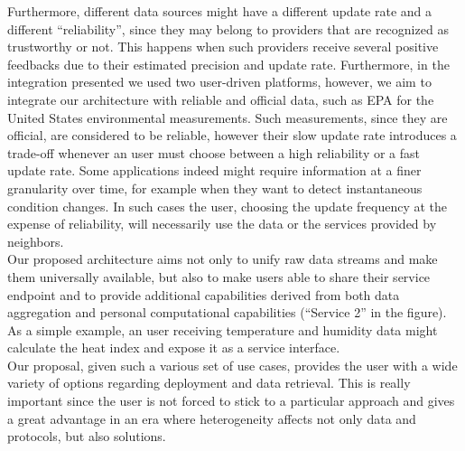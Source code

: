 Furthermore, different data sources might have a different update rate and a different ``reliability'', since they may belong to providers that are recognized as trustworthy or not.
This happens when such providers receive several positive feedbacks due to their estimated precision and update rate.
Furthermore, in the integration presented we used two user-driven platforms, however, we aim to integrate our architecture with reliable and official data, such as EPA for the United States environmental measurements.
Such measurements, since they are official, are considered to be reliable, however their slow update rate introduces a trade-off whenever an user must choose between a high reliability or a fast update rate.
Some applications indeed might require information at a finer granularity over time, for example when they want to detect instantaneous condition changes.
In such cases the user, choosing the update frequency at the expense of reliability, will necessarily use the data or the services provided by neighbors.
\\

Our proposed architecture aims not only to unify raw data streams and make them universally available, but also to make users able to share their service endpoint and to provide additional capabilities derived from both data aggregation and personal computational capabilities (``Service 2'' in the figure).
As a simple example, an user receiving temperature and humidity data might calculate the heat index and expose it as a service interface.
\\

Our proposal, given such a various set of use cases, provides the user with a wide variety of options regarding deployment and data retrieval.
This is really important since the user is not forced to stick to a particular approach and gives a great advantage in an era where heterogeneity affects not only data and protocols, but also solutions.